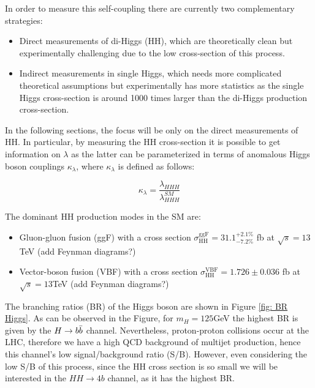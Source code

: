 In order to measure this self-coupling there are currently two complementary strategies:
\begin{itemize}
    \item Direct measurements of di-Higgs (HH), which are theoretically clean but experimentally challenging due to the low cross-section of this process.
    \item Indirect measurements in single Higgs, which needs more complicated theoretical assumptions but experimentally has more statistics as the single Higgs cross-section is around 1000 times larger than the di-Higgs production cross-section.
\end{itemize}

In the following sections, the focus will be only on the direct measurements of HH. In particular, by measuring the HH cross-section it is possible to get information on $\lambda$ as the latter can be parameterized in terms of anomalous Higgs boson couplings $\kappa_\lambda$, where $\kappa_\lambda$ is defined as follows:

\begin{equation}
    \kappa_\lambda=\frac{\lambda_{HHH}}{\lambda^{SM}_{HHH}}
\end{equation}


The dominant HH production modes in the SM are:
\begin{itemize}
    \item Gluon-gluon fusion (ggF) with a cross section $\sigma^{\text{ggF}}_{\text{HH}}=31.1^{+2.1\%}_{-7.2\%}$ fb at $\sqrt{s}=13$TeV (add Feynman diagrams?)
    \item Vector-boson fusion (VBF) with a cross section $\sigma^{\text{VBF}}_{\text{HH}}= 1.726 \pm 0.036$ fb at $\sqrt{s}=13$TeV (add Feynman diagrams?)
\end{itemize}


The branching ratios (BR) of the Higgs boson are shown in Figure \ref{fig: BR Higgs}. As can be observed in the Figure, for $m_H=125$GeV the highest BR is given by the $H\to b\Bar{b}$ channel. Nevertheless, proton-proton collisions occur at the LHC, therefore we have a high QCD background of multijet production, hence this channel's low signal/background ratio (S/B). However, even considering the low S/B of this process, since the HH cross section is so small we will be interested in the $HH \to 4b$ channel, as it has the highest BR.


